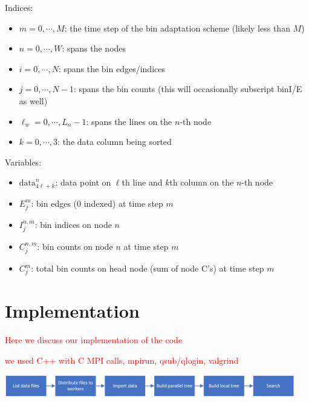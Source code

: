 \documentclass{article}
\begin{document}
\begin{mdframed}[backgroundcolor=blue!20]
	Indices:
	\setlength\itemsep{0.1pt}
	\setlength\parskip{0.1pt}
	\begin{itemize}
		\setlength\itemsep{0.1pt}
		\setlength\parskip{0.1pt}
		\item $m = 0, \cdots, M$: the time step of the bin adaptation scheme (likely less than $M$)
		\item $n = 0, \cdots, W$: spans the nodes
		\item $i = 0, \cdots, N$: spans the bin edges/indices
		\item $j = 0, \cdots, N-1$: spans the bin counts (this will occasionally subscript binI/E as well)
		\item $\ell_w = 0, \cdots, L_n-1$: spans the lines on the $n$-th node
		\item $k = 0, \cdots, 3$: the data column being sorted
	\end{itemize}
\end{mdframed}

\begin{mdframed}[backgroundcolor=blue!20]
	Variables:
	\setlength\itemsep{0.1pt}
	\setlength\parskip{0.1pt}
	\begin{itemize}
		\setlength\itemsep{0.1pt}
		\setlength\parskip{0.1pt}
		\item $\textrm{data}^n_{4\ell+k}$: data point on $\ell$th line and $k$th column on the $n$-th node
		\item ${E}^m_j$: bin edges (0 indexed) at time step $m$
		\item ${I}^{n,m}_j$: bin indices on node $n$
		\item ${C}^{n,m}_j$: bin counts on node $n$ at time step $m$
		\item ${C}^m_j$: total bin counts on head node (sum of node C's) at time step $m$
	\end{itemize}
\end{mdframed}


%
%

\section{Implementation}
%
%
\textcolor{red}{Here we discuss our implementation of the code}

\textcolor{red}{we used C++ with C MPI calls, mpirun, qsub/qlogin, valgrind}

\begin{center}
\includegraphics[width=0.95\textwidth]{images/flow.png}
\end{center}
\end{document}

